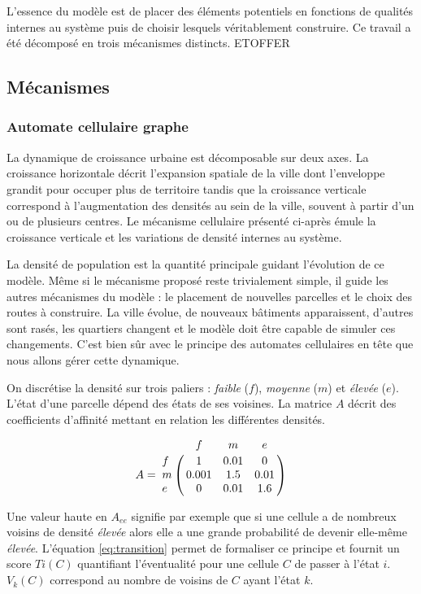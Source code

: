 \documentclass[12pt]{article}
\begin{document}
L'essence du modèle est de placer des éléments potentiels en fonctions
de qualités internes au système puis de choisir lesquels véritablement
construire. Ce travail a été décomposé en trois mécanismes
distincts. ETOFFER

\subsection{Mécanismes}

\subsubsection{Automate cellulaire graphe}

La dynamique de croissance urbaine est décomposable sur deux axes. La
croissance horizontale décrit l'expansion spatiale de la ville dont
l'enveloppe grandit pour occuper plus de territoire tandis que la
croissance verticale correspond à l'augmentation des densités au sein
de la ville, souvent à partir d'un ou de plusieurs centres. Le
mécanisme cellulaire présenté ci-après émule la croissance verticale
et les variations de densité internes au système.

La densité de population est la quantité principale guidant
l'évolution de ce modèle. Même si le mécanisme proposé reste
trivialement simple, il guide les autres mécanismes du modèle : le
placement de nouvelles parcelles et le choix des routes à
construire. La ville évolue, de nouveaux bâtiments apparaissent,
d'autres sont rasés, les quartiers changent et le modèle doit être
capable de simuler ces changements. C'est bien sûr avec le principe
des automates cellulaires en tête que nous allons gérer cette
dynamique.

On discrétise la densité sur trois paliers : \textit{faible} ($f$),
\textit{moyenne} ($m$) et \textit{élevée} ($e$). L'état d'une parcelle
dépend des états de ses voisines. La matrice $A$ décrit des
coefficients d'affinité mettant en relation les différentes
densités.

\begin{equation}
A =
\bordermatrix{
    & f & m & e \cr
  f & 1 & 0.01 & 0 \cr
  m & 0.001 & 1.5 & 0.01 \cr
  e & 0 & 0.01 & 1.6
}
\end{equation}

Une valeur haute en $A_{ee}$ signifie par exemple que si une cellule a
de nombreux voisins de densité \textit{élevée} alors elle a une grande
probabilité de devenir elle-même \textit{élevée}. L'équation
\ref{eq:transition} permet de formaliser ce principe et fournit un
score $Ti(C)$ quantifiant l'éventualité pour une cellule $C$ de passer
à l'état $i$. $V_k(C)$ correspond au nombre de voisins de $C$ ayant
l'état $k$.
\end{document}
